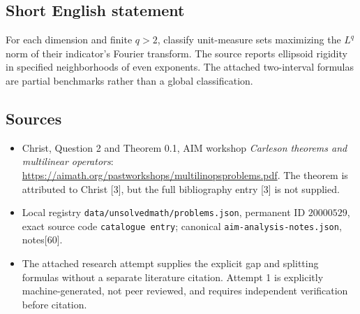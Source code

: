 \documentclass[11pt]{article}
\begin{document}
\subsection{Short English statement}
For each dimension and finite \(q>2\), classify unit-measure sets maximizing the \(L^q\) norm of their indicator's Fourier transform. The source reports ellipsoid rigidity in specified neighborhoods of even exponents. The attached two-interval formulas are partial benchmarks rather than a global classification.
\subsection{Sources}
\begin{itemize}
\item Christ, Question 2 and Theorem 0.1, AIM workshop \emph{Carleson theorems and multilinear operators}: \url{https://aimath.org/pastworkshops/multilinopsproblems.pdf}. The theorem is attributed to Christ [3], but the full bibliography entry [3] is not supplied.
\item Local registry \texttt{data/unsolvedmath/problems.json}, permanent ID \(20000529\), exact source code \texttt{catalogue entry}; canonical \texttt{aim-analysis-notes.json}, notes[60].
\item The attached research attempt supplies the explicit gap and splitting formulas without a separate literature citation. Attempt 1 is explicitly machine-generated, not peer reviewed, and requires independent verification before citation.
\end{itemize}
\end{document}
